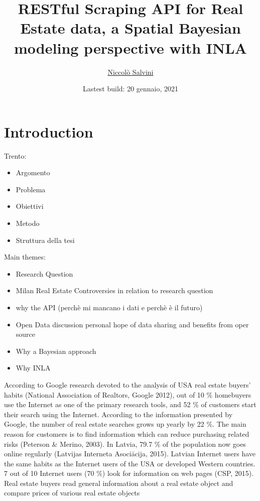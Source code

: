 \documentclass[
  12pt,
  a4paper,
  oneside]{book}
\title{RESTful Scraping API for Real Estate data, a Spatial Bayesian modeling perspective with INLA}
\author{\href{https://niccolosalvini.netlify.app/}{Niccolò Salvini}}
\date{Lastest build: 20 gennaio, 2021}
\providecommand{\tightlist}{%
  \setlength{\itemsep}{0pt}\setlength{\parskip}{0pt}}
\let\oldmaketitle\maketitle
\theoremstyle{definition}
\theoremstyle{definition}
\theoremstyle{definition}
\theoremstyle{remark}
\begin{document}
\maketitle


\newpage

\let\maketitle\oldmaketitle
\maketitle

{
\setcounter{tocdepth}{2}
\tableofcontents
}
\listoftables
\listoffigures
{}
\hypertarget{intro}{%
\chapter{Introduction}\label{intro}}

Trento:

\begin{itemize}
\tightlist
\item
  Argomento
\item
  Problema
\item
  Obiettivi
\item
  Metodo
\item
  Struttura della tesi
\end{itemize}

Main themes:

\begin{itemize}
\tightlist
\item
  Research Question
\item
  Milan Real Estate Controversies in relation to research question
\item
  why the API (perchè mi mancano i dati e perchè è il futuro)
\item
  Open Data discussion personal hope of data sharing and benefits from oper source
\item
  Why a Bayesian approach
\item
  Why INLA
\end{itemize}

According to Google research devoted to the analysis of USA real estate
buyers' habits (National Association of Realtors, Google 2012), out of 10 \%
homebuyers use the Internet as one of the primary research tools, and 52 \% of
customers start their search using the Internet. According to the information
presented by Google, the number of real estate searches grows up yearly by 22 \%.
The main reason for customers is to find information which can reduce purchasing
related risks (Peterson \& Merino, 2003).
In Latvia, 79.7 \% of the population now goes online regularly (Latvijas
Interneta Asociācija, 2015). Latvian Internet users have the same habits as the
Internet users of the USA or developed Western countries. 7 out of 10 Internet
users (70 \%) look for information on web pages (CSP, 2015). Real estate buyers
read general information about a real estate object and compare prices of various
real estate objects
\end{document}
